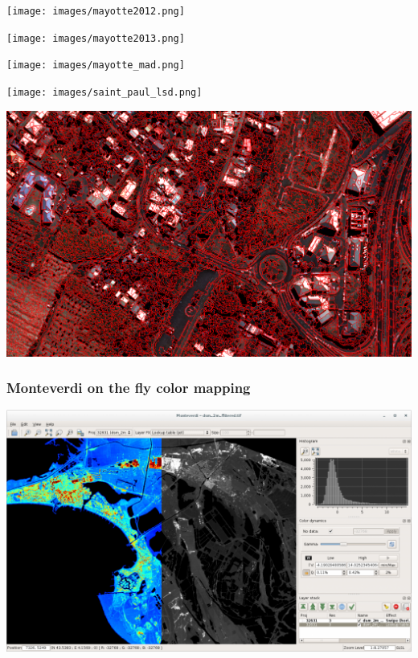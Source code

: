 \documentclass[smaller]{beamer}
\begin{document}
\vspace*{-6.5mm}
\begin{frame}[plain]
\hspace*{-11mm}
    \texttt{[image: images/mayotte2012.png]}
\end{frame}

\vspace*{-6.5mm}
\begin{frame}[plain]
\hspace*{-11mm}
    \texttt{[image: images/mayotte2013.png]}
\end{frame}

\vspace*{-6.5mm}
\begin{frame}[plain]
\hspace*{-11mm}
    \texttt{[image: images/mayotte\_mad.png]}
\end{frame}

\vspace*{-6.5mm}
\begin{frame}[plain]
\hspace*{-11mm}
\texttt{[image: images/saint\_paul\_lsd.png]}
\end{frame}


\vspace*{-6.5mm}
\begin{frame}[plain]
\hspace*{-11mm}
    \includegraphics[keepaspectratio,height=1.1\paperheight]{images/segmentation.png}
\end{frame}

\begin{frame}
\frametitle{Monteverdi on the fly color mapping}
\includegraphics[width=1\textwidth]{images/monteverdi-colormapping.png}
\end{frame}
\end{document}
